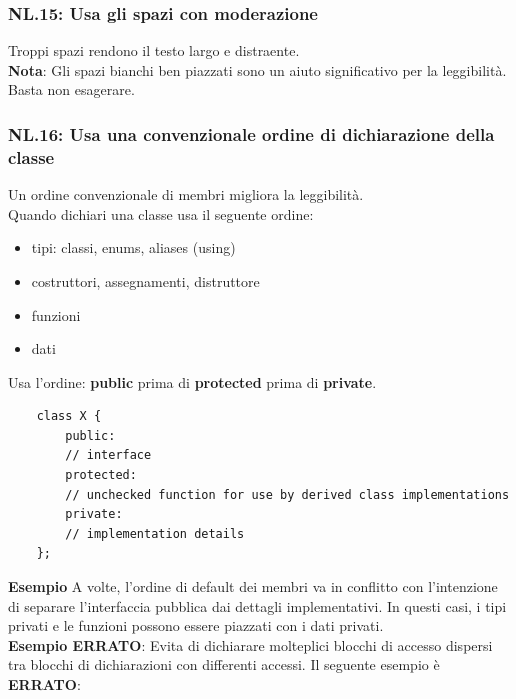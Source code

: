 \subsubsection{NL.15: Usa gli spazi con moderazione}

\textsf{\small Troppi spazi rendono il testo largo e distraente.} \\

\textsf{\small \textbf{Nota}: Gli spazi bianchi ben piazzati sono un aiuto significativo per la leggibilità. Basta non esagerare.} \\

\subsubsection{NL.16: Usa una convenzionale ordine di dichiarazione della classe}

\textsf{\small Un ordine convenzionale di membri migliora la leggibilità.} \\

\textsf{\small Quando dichiari una classe usa il seguente ordine: } \\

\begin{itemize}
	\item \textsf{\small tipi: classi, enums, aliases (using)}
	\item \textsf{\small costruttori, assegnamenti, distruttore}
	\item \textsf{\small funzioni}
	\item \textsf{\small dati}
\end{itemize}

\textsf{\small Usa l'ordine: \textbf{public} prima di \textbf{protected} prima di \textbf{private}. } \\

\begin{lstlisting}
	class X {
		public:
		// interface
		protected:
		// unchecked function for use by derived class implementations
		private:
		// implementation details
	};
\end{lstlisting}

\textsf{\small \textbf{Esempio} A volte, l'ordine di default dei membri va in conflitto con l'intenzione di separare l'interfaccia pubblica dai dettagli implementativi. In questi casi, i tipi privati e le funzioni possono essere piazzati con i dati privati.} \\

\textsf{\small \textbf{Esempio ERRATO}: Evita di dichiarare molteplici blocchi di accesso dispersi tra blocchi di dichiarazioni con differenti accessi. Il seguente esempio è \textbf{\color{red}ERRATO}\normalcolor: } \\

